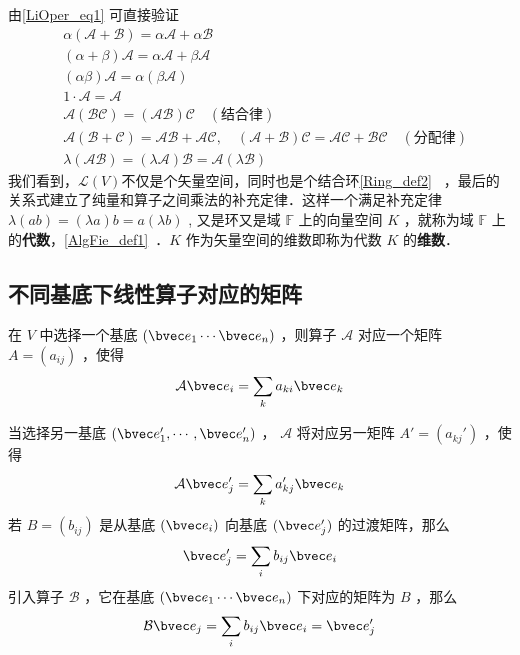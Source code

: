 由\autoref{LiOper_eq1} 可直接验证
\begin{equation}
\begin{aligned}
&\alpha(\mathcal{A+B})=\alpha\mathcal{A}+\alpha\mathcal{B}\\
&(\alpha+\beta)\mathcal{A}=\alpha\mathcal{A}+\beta\mathcal{A}\\
&(\alpha\beta)\mathcal{A}=\alpha(\beta\mathcal{A})\\
&1\cdot \mathcal{A}=\mathcal A\\
&\mathcal{A}(\mathcal{BC})=(\mathcal{AB})\mathcal C\quad(\text{结合律})\\
&\mathcal A(\mathcal{B+C})=\mathcal{AB+AC},\quad (\mathcal{A+B})\mathcal C=\mathcal{AC+BC}\quad(\text{分配律})\\
&\lambda(\mathcal{AB})=(\lambda\mathcal{A})\mathcal{B}=\mathcal{A}(\lambda \mathcal B)
\end{aligned}
\end{equation}
我们看到，$\mathcal{L}(V)$不仅是个矢量空间，同时也是个结合环\autoref{Ring_def2}~ ，最后的关系式建立了纯量和算子之间乘法的补充定律．这样一个满足补充定律 $\lambda(ab)=(\lambda a)b=a(\lambda b)$ , 又是环又是域 $\mathbb{F}$ 上的向量空间 $K$ ，就称为域 $\mathbb{F}$ 上的\textbf{代数}，\autoref{AlgFie_def1}~．$K$ 作为矢量空间的维数即称为代数 $K$ 的\textbf{维数}．

\subsection{不同基底下线性算子对应的矩阵}
在 $V$ 中选择一个基底 $(\bvec e_1\cdots \bvec e_n)$ ，则算子 $\mathcal{A}$ 对应一个矩阵 $A=(a_{ij})$ ，使得
\begin{equation}
\mathcal{A}\bvec e_i=\sum_{k} a_{ki}\bvec e_k
\end{equation}

当选择另一基底 $(\bvec e_1',\cdots,\bvec e_n')$ ， $\mathcal{A}$ 将对应另一矩阵 $A'=(a_{kj}')$ ，使得
\begin{equation}
\mathcal{A}\bvec e_j'=\sum_{k} a'_{kj}\bvec e_k
\end{equation}
若 $B=(b_{ij})$ 是从基底 $(\bvec e_i)$ 向基底 $(\bvec e_j')$ 的过渡矩阵，那么
\begin{equation}
\bvec e_j'=\sum_i b_{ij}\bvec e_i
\end{equation}
引入算子 $\mathcal{B}$ ，它在基底 $(\bvec e_1\cdots \bvec e_n)$ 下对应的矩阵为 $B$ ，那么
\begin{equation}
\mathcal{B}\bvec e_j=\sum_i b_{ij}\bvec e_i=\bvec e_j'
\end{equation}


